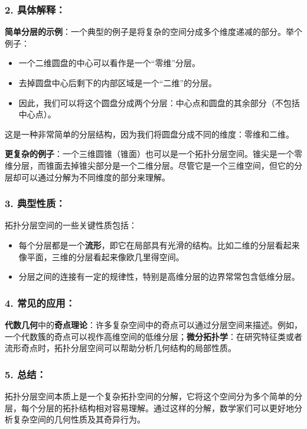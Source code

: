 \documentclass[lang=cn,zihao=5,twoside,fontset=none]{textbook}
\begin{document}
\subsubsection{2. \textbf{具体解释}：}
 \textbf{简单分层的示例}：一个典型的例子是将复杂的空间分成多个维度递减的部分。举个例子：
 \begin{itemize}
    \item 一个二维圆盘的中心可以看作是一个“零维”分层。
    \item 去掉圆盘中心后剩下的内部区域是一个“二维”的分层。
    \item 因此，我们可以将这个圆盘分成两个分层：中心点和圆盘的其余部分（不包括中心点）。
 \end{itemize}

这是一种非常简单的分层结构，因为我们将圆盘分成不同的维度：零维和二维。

 \textbf{更复杂的例子}：一个三维圆锥（锥面）也可以是一个拓扑分层空间。锥尖是一个零维分层，而锥面去掉锥尖部分是一个二维分层。尽管它是一个三维空间，但它的分层却可以通过分解为不同维度的部分来理解。

\subsubsection{3. \textbf{典型性质}：}
拓扑分层空间的一些关键性质包括：
\begin{itemize}
\item 每个分层都是一个\textbf{流形}，即它在局部具有光滑的结构。比如二维的分层看起来像平面，三维的分层看起来像欧几里得空间。
\item 分层之间的连接有一定的规律性，特别是高维分层的边界常常包含低维分层。
\end{itemize}

\subsubsection{4. \textbf{常见的应用}：}
\textbf{代数几何}中的\textbf{奇点理论}：许多复杂空间中的奇点可以通过分层空间来描述。例如，一个代数簇的奇点可以视作高维空间的低维分层；\textbf{微分拓扑学}：在研究特征类或者流形奇点时，拓扑分层空间可以帮助分析几何结构的局部性质。

\subsubsection{5. \textbf{总结}：}
拓扑分层空间本质上是一个复杂拓扑空间的分解，它将这个空间分为多个简单的分层，每个分层的拓扑结构相对容易理解。通过这样的分解，数学家们可以更好地分析复杂空间的几何性质及其奇异行为。
\end{document}
